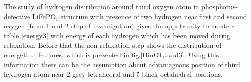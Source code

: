 
The study of hydrogen distribution around third oxygen atom in phosphorus-defective LiFePO$_{4}$ structure with presence of two hydrogen near first and second oxygen (from 1 and 2 step of investigation) gives the oppotrunity to create a table \ref{energy3} with energy of each hydrogen which has been moved during relaxation. Before that the non-relaxation step shows the distribution of energetical features, which is presented in fig.\ref{HinO1,2and3}. Using this information there can be the assumption about advantageous position of third hydrogen atom near 2 grey tetrahedral and 5 black octahedral positions. 

